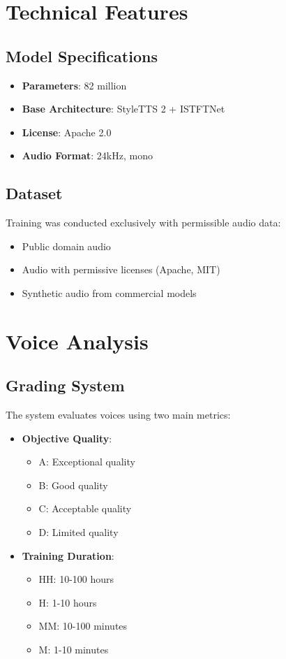 \section{Technical Features}
\label{sec:technical-features}

\subsection{Model Specifications}
\begin{itemize}
	\item \textbf{Parameters}: 82 million
	\item \textbf{Base Architecture}: StyleTTS 2 + ISTFTNet
	\item \textbf{License}: Apache 2.0
	\item \textbf{Audio Format}: 24kHz, mono
\end{itemize}

\subsection{Dataset}
Training was conducted exclusively with permissible audio data:
\begin{itemize}
	\item Public domain audio
	\item Audio with permissive licenses (Apache, MIT)
	\item Synthetic audio from commercial models
\end{itemize}

\section{Voice Analysis}
\label{sec:voice-analysis}

\subsection{Grading System}
\label{subsec:grading-system}

The system evaluates voices using two main metrics:

\begin{itemize}
	\item \textbf{Objective Quality}:
	      \begin{itemize}
		      \item A: Exceptional quality
		      \item B: Good quality
		      \item C: Acceptable quality
		      \item D: Limited quality
	      \end{itemize}

	\item \textbf{Training Duration}:
	      \begin{itemize}
		      \item HH: 10-100 hours
		      \item H: 1-10 hours
		      \item MM: 10-100 minutes
		      \item M: 1-10 minutes
	      \end{itemize}
\end{itemize}

